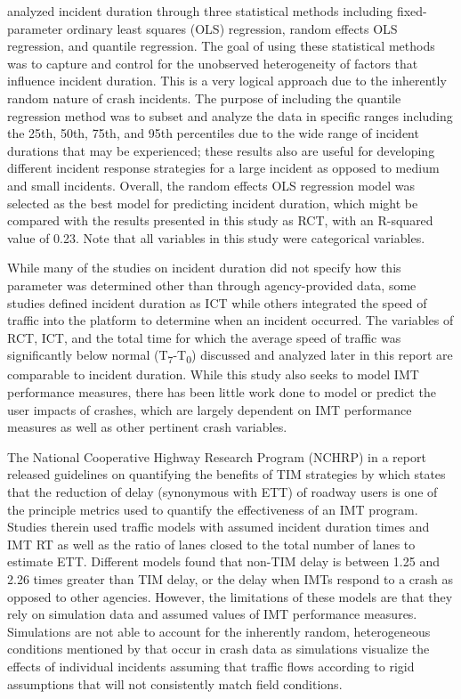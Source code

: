 \documentclass[
  letterpaper,
  authoryear]{elsarticle}
\begin{document}
\citet{wali_heterogeneity_2022} analyzed incident duration through three
statistical methods including fixed-parameter ordinary least squares
(OLS) regression, random effects OLS regression, and quantile
regression. The goal of using these statistical methods was to capture
and control for the unobserved heterogeneity of factors that influence
incident duration. This is a very logical approach due to the inherently
random nature of crash incidents. The purpose of including the quantile
regression method was to subset and analyze the data in specific ranges
including the 25th, 50th, 75th, and 95th percentiles due to the wide
range of incident durations that may be experienced; these results also
are useful for developing different incident response strategies for a
large incident as opposed to medium and small incidents. Overall, the
random effects OLS regression model was selected as the best model for
predicting incident duration, which might be compared with the results
presented in this study as RCT, with an R-squared value of 0.23. Note
that all variables in this study were categorical variables.

While many of the studies on incident duration did not specify how this
parameter was determined other than through agency-provided data, some
studies defined incident duration as ICT while others integrated the
speed of traffic into the platform to determine when an incident
occurred. The variables of RCT, ICT, and the total time for which the
average speed of traffic was significantly below normal
(T\textsubscript{7}-T\textsubscript{0}) discussed and analyzed later in
this report are comparable to incident duration. While this study also
seeks to model IMT performance measures, there has been little work done
to model or predict the user impacts of crashes, which are largely
dependent on IMT performance measures as well as other pertinent crash
variables.

The National Cooperative Highway Research Program (NCHRP) in a report
released guidelines on quantifying the benefits of TIM strategies by
\citet{shah_development_2022} which states that the reduction of delay
(synonymous with ETT) of roadway users is one of the principle metrics
used to quantify the effectiveness of an IMT program. Studies therein
used traffic models with assumed incident duration times and IMT RT as
well as the ratio of lanes closed to the total number of lanes to
estimate ETT. Different models found that non-TIM delay is between 1.25
and 2.26 times greater than TIM delay, or the delay when IMTs respond to
a crash as opposed to other agencies. However, the limitations of these
models are that they rely on simulation data and assumed values of IMT
performance measures. Simulations are not able to account for the
inherently random, heterogeneous conditions mentioned by
\citet{wali_heterogeneity_2022} that occur in crash data as simulations
visualize the effects of individual incidents assuming that traffic
flows according to rigid assumptions that will not consistently match
field conditions.
\end{document}
